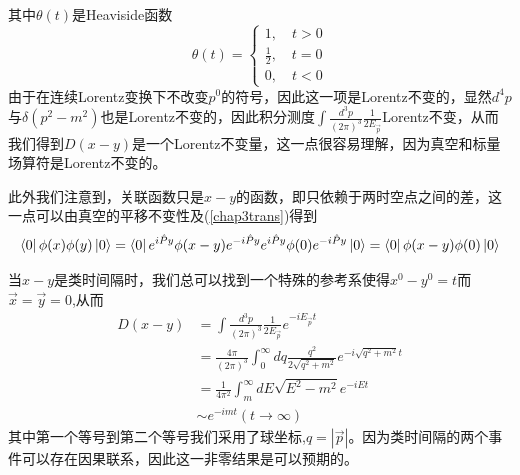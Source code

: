 其中$\theta(t)$是Heaviside函数
\begin{equation}
    \theta(t)=\left\{
    \begin{array}{cc}
          1,\quad t> 0\\
          \frac{1}{2},\quad t=0 \\
          0,\quad t < 0
    \end{array}
    \right.
\end{equation}
由于在连续Lorentz变换下不改变$p^{0}$的符号，因此这一项是Lorentz不变的，显然$d^{4}p$与$\delta(p^{2}-m^{2})$也是Lorentz不变的，因此积分测度$\int \frac{d^{3}p}{(2\pi)^{3}}\frac{1}{2E_{\vec{p}}}$Lorentz不变，从而我们得到$D(x-y)$是一个Lorentz不变量，这一点很容易理解，因为真空和标量场算符是Lorentz不变的。

此外我们注意到，关联函数只是$x-y$的函数，即只依赖于两时空点之间的差，这一点可以由真空的平移不变性及(\ref{chap3trans})得到
\begin{equation}
    \bra{0}\phi(x)\phi(y)\ket{0}=\bra{0}e^{i\hat{P}y}\phi(x-y)e^{-i\hat{P}y}e^{i\hat{P}y}\phi(0)e^{-i\hat{P}y}\ket{0}=\bra{0}\phi(x-y)\phi(0)\ket{0}
\end{equation}

当$x-y$是类时间隔时，我们总可以找到一个特殊的参考系使得$x^{0}-y^{0}=t$而$\vec{x}=\vec{y}=0$,从而
\begin{equation}
\label{chap3222}
    \begin{aligned}
        D(x-y)&=\int \frac{d^{3}p}{(2\pi)^{3}}\frac{1}{2E_{\vec{p}}}e^{-iE_{\vec{p}}t}\\
        &=\frac{4\pi}{(2\pi)^{3}}\int_{0}^{\infty}dq\frac{q^{2}}{2\sqrt{q^{2}+m^{2}}}e^{-i\sqrt{q^{2}+m^{2}}t}\\
        &=\frac{1}{4\pi^{2}}\int_{m}^{\infty}dE\sqrt{E^{2}-m^{2}}e^{-iEt}\\
        &\sim e^{-imt} (t\rightarrow\infty)
    \end{aligned}
\end{equation}
其中第一个等号到第二个等号我们采用了球坐标,$q=|\vec{p}|$。因为类时间隔的两个事件可以存在因果联系，因此这一非零结果是可以预期的。

